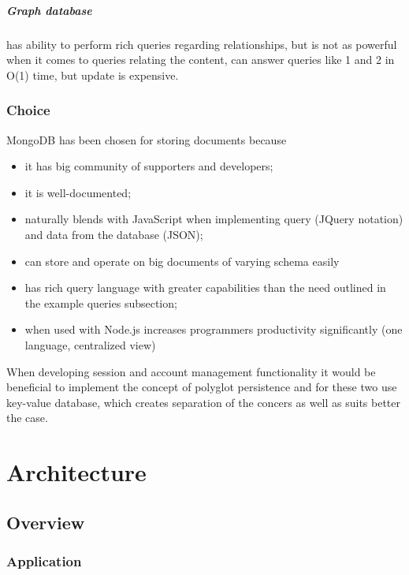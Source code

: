 \documentclass{tufte-book}
\begin{document}
\paragraph{Graph database} has ability to perform rich queries regarding relationships, but is not as powerful when it comes to queries relating the content, can answer queries like 1 and 2 in O(1) time, but update is expensive.

\subsection{Choice}
MongoDB has been chosen for storing documents because
\begin{itemize}
  \item it has big community of supporters and developers;
  \item it is well-documented;
  \item naturally blends with JavaScript when implementing query (JQuery notation) and data from the database (JSON);
  \item can store and operate on big documents of varying schema easily
  \item has rich query language with greater capabilities than the need outlined in the example queries subsection;
  \item when used with Node.js increases programmers productivity significantly (one language, centralized view)
\end{itemize}

When developing session and account management functionality it would be beneficial to implement the concept of polyglot persistence and for these two use key-value database, which creates separation of the concers as well as suits better the case.


\chapter{Architecture}

\section{Overview}

\subsection{Application}
\end{document}
